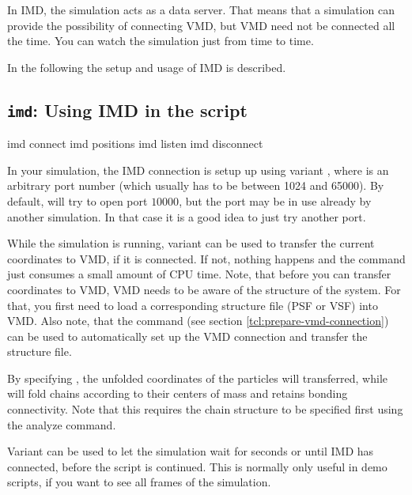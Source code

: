 In IMD, the simulation acts as a data server. That means that a
simulation can provide the possibility of connecting VMD, but VMD need
not be connected all the time. You can watch the simulation just from
time to time.

In the following the setup and usage of IMD is described.

\subsection{\texttt{imd}: Using IMD in the script}

\begin{essyntax}
   imd connect 
   imd positions 
   imd listen 
   imd disconnect
\end{essyntax}

In your simulation, the IMD connection is setup up using variant
, where  is an arbitrary port number (which
usually has to be between 1024 and 65000). By default, \es will try to
open port $10000$, but the port may be in use already by another \es
simulation. In that case it is a good idea to just try another port.

While the simulation is running, variant  can be used to
transfer the current coordinates to VMD, if it is connected.  If not,
nothing happens and the command just consumes a small amount of CPU
time. Note, that before you can transfer coordinates to VMD, VMD needs
to be aware of the structure of the system. For that, you first need
to load a corresponding structure file (PSF or VSF) into VMD. Also
note, that the command  (see section
\vref{tcl:prepare-vmd-connection}) can be used to automatically set up
the VMD connection and transfer the structure file.

By specifying , the unfolded coordinates of the
particles will transferred, while  will fold chains
according to their centers of mass and retains bonding connectivity.
Note that this requires the chain structure to be specified first
using the analyze command.

Variant  can be used to let the simulation wait for
 seconds or until IMD has connected, before the script is
continued. This is normally only useful in demo scripts, if you want
to see all frames of the simulation.

